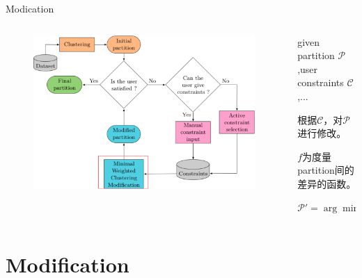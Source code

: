 \documentclass{beamer}
\begin{document}
\begin{frame}{Modication}
    \begin{columns}
        \begin{column}{0.5\textwidth}
            \begin{figure}[htpb]
                \begin{center}
                    \includegraphics[width=0.8\linewidth]{./images/modify.png}
                \end{center}
            \end{figure}
        \end{column}     
        \begin{column}{0.48\textwidth}
            given partition $\mathcal{P}$,user constraints $\mathcal{C}$,...

            根据$\mathcal{C}$，对$\mathcal{P}$进行修改。
            
            $f$为度量partition间的差异的函数。

            $\mathcal{P}'=\arg\min f(\mathcal{P}',\mathcal{P})$
            
        \end{column}
    \end{columns}
    
\end{frame}

\section{Modification}
\end{document}
